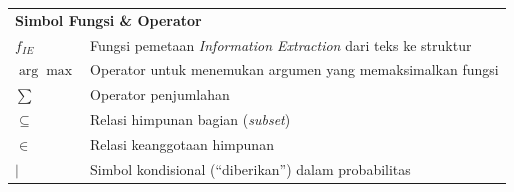 \documentclass{SkripsiUnesa}
\begin{document}
\begin{longtable}{p{} p{}}
    \multicolumn{2}{l}{\textbf{Simbol Fungsi \& Operator}} \\[0.5em]
    $f_{IE}$ & Fungsi pemetaan \textit{Information Extraction} dari teks ke struktur \\
    $\arg\max$ & Operator untuk menemukan argumen yang memaksimalkan fungsi \\
    $\sum$ & Operator penjumlahan \\
    $\subseteq$ & Relasi himpunan bagian (\textit{subset}) \\
    $\in$ & Relasi keanggotaan himpunan \\
    $\mid$ & Simbol kondisional (``diberikan'') dalam probabilitas \\
\end{longtable}
\newpage

\Inti











\nocite{*}

\Glosarium
\BukaLampiran

\UjiAhli




\end{document}
